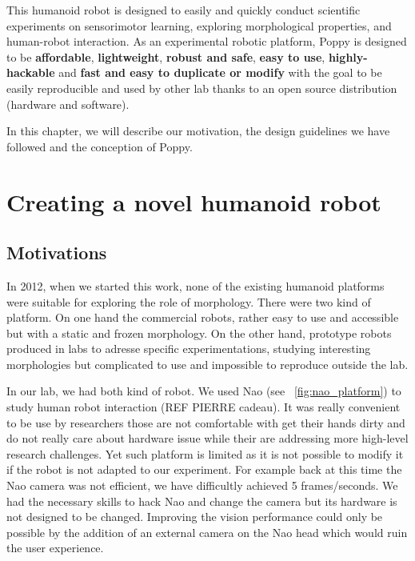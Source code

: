 This humanoid robot is designed to easily and quickly conduct scientific experiments on sensorimotor learning, exploring morphological properties, and human-robot interaction. As an experimental robotic platform, Poppy is designed to be \textbf{affordable}, \textbf{lightweight}, \textbf{robust and safe}, \textbf{easy to use}, \textbf{highly-hackable} and \textbf{fast and easy to duplicate or modify} with the goal to be easily reproducible and used by other lab thanks to an open source distribution (hardware and software).

In this chapter,  we will describe our motivation, the design guidelines we have followed and the conception of Poppy.


\section{Creating a novel humanoid robot} %

\subsection{Motivations} %

In 2012, when we started this work, none of the existing humanoid platforms were suitable for exploring the role of morphology. There were two kind of platform. On one hand the commercial robots, rather easy to use and accessible but with a static and frozen morphology. On the other hand, prototype robots produced in labs to adresse specific experimentations, studying interesting morphologies but complicated to use and impossible to reproduce outside the lab.

In our lab, we had both kind of robot. We used Nao (see \figurename~\ref{fig:nao_platform}) to study human robot interaction (REF PIERRE cadeau). It was really convenient to be use by researchers those are not comfortable with get their hands dirty and do not really care about hardware issue while their are addressing more high-level research challenges. Yet such platform is limited as it is not possible to modify it if the robot is not adapted to our experiment. For example back at this time the Nao camera was not efficient, we have difficultly achieved 5 frames/seconds.
We had the necessary skills to hack Nao and change the camera but its hardware is not designed to be changed. Improving the vision performance could only be possible by the addition of an external camera on the Nao head which would ruin the user experience.

